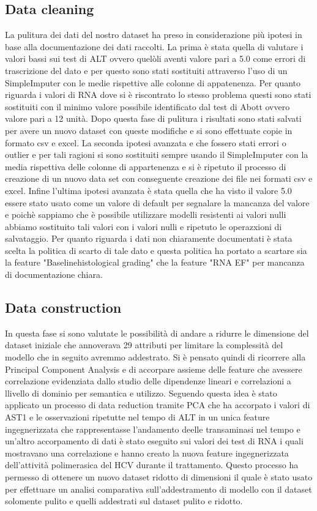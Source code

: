 \documentclass[italian,12pt,a4paper]{article}
\begin{document}
    \subsection{Data cleaning}
    La pulitura dei dati del nostro dataset ha preso in considerazione più ipotesi in base alla documentazione dei dati raccolti. La prima è stata quella di valutare i valori bassi sui test di ALT ovvero quelòli aventi valore pari a 5.0 come errori di trascrizione del dato e per questo sono stati sostituiti attraverso l'uso di un SimpleImputer con le medie rispettive alle colonne di appatenenza. Per quanto riguarda i valori di RNA dove si è  riscontrato lo stesso problema questi sono stati sostituiti con il minimo valore possibile identificato dal test di Abott ovvero valore pari a 12 unità. Dopo questa fase di pulitura i risultati sono stati salvati per avere un nuovo dataset con queste modifiche e si sono effettuate copie in formato csv e excel. La seconda ipotesi avanzata e che fossero stati errori o outlier e per tali ragioni si sono sostituiti sempre usando il SimpleImputer con la media rispettiva delle colonne di appartenenza e si è ripetuto il processo di creazione di un nuovo data set con conseguente creazione dei file nei formati csv e excel. Infine l'ultima ipotesi avanzata è stata quella che ha visto il valore 5.0 essere stato usato come un valore di default per segnalare la mancanza del valore e poichè sappiamo che è possibile utilizzare modelli resistenti ai valori nulli abbiamo sostituito tali valori con i valori nulli e ripetuto le operazxioni di salvataggio. Per quanto riguarda i dati non chiaramente documentati è stata scelta la politica di scarto  di tale dato e questa politica ha portato a scartare sia la feature "Baselinehistological grading" che la feature "RNA EF" per mancanza di documentazione chiara. 
    
    \subsection{Data construction}
    In questa fase si sono valutate le possibilità di andare a ridurre le dimensione del dataset iniziale che annoverava 29 attributi per limitare la complessità del modello che in seguito avremmo addestrato. Si è pensato quindi di ricorrere alla Principal Component Analysis e di accorpare assieme delle feature che avessere correlazione evidenziata dallo studio delle dipendenze lineari e correlazioni a llivello di dominio per semantica e utilizzo. Seguendo questa idea è stato applicato un processo di data reduction tramite PCA che ha accorpato i valori di AST1 e le osservazioni ripetutte nel tempo di ALT in un unica feature ingegnerizzata che rappresentasse l'andamento deelle transaminasi nel tempo e un'altro accorpamento di dati è stato eseguito sui valori dei test di RNA i quali mostravano una correlazione e hanno creato la nuova feature ingegnerizzata dell'attività polimerasica del HCV durante il trattamento. Questo processo ha permesso di ottenere un nuovo dataset ridotto di dimensioni il quale è stato usato per effettuare un analisi comparativa sull'addestramento di modello con il dataset solomente pulito e quelli addestrati sul dataset pulito e ridotto.
\end{document}
